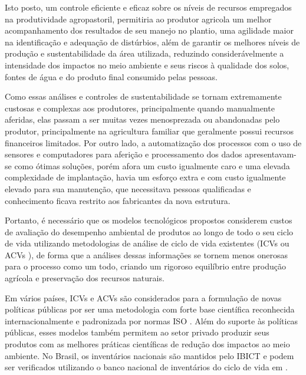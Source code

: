 Isto posto, um controle eficiente e eficaz sobre os n\'{i}veis de recursos empregados na produtividade agropastoril, permitiria ao produtor agricola um melhor acompanhamento dos resultados de seu manejo no plantio, uma agilidade maior na identifica\c{c}\~{a}o e adequa\c{c}\~{a}o de dist\'{u}rbios, al\'{e}m de garantir os melhores n\'{i}veis de produ\c{c}\~{a}o e sustentabilidade da \'{a}rea utilizada, reduzindo consider\'{a}velmente a intensidade dos impactos no meio ambiente e seus riscos \`{a} qualidade dos solos, fontes de \'{a}gua e do produto final consumido pelas pessoas.

Como essas an\'{a}lises e controles de sustentabilidade se tornam extremamente custosas e complexas aos produtores, principalmente quando manualmente aferidas, elas passam a ser muitas vezes menosprezada ou abandonadas pelo produtor, principalmente na agricultura familiar que geralmente possui recursos financeiros limitados. Por outro lado, a automatiza\c{c}\~{a}o dos processos com o uso de sensores e computadores para aferi\c{c}\~{a}o e processamento dos dados apresentavam-se como \'{o}timas solu\c{c}\~{o}es, por\'{e}m afora um custo igualmente caro e uma elevada complexidade de implanta\c{c}\~{a}o, havia um esfor\c{c}o extra e com custo igualmente elevado para sua manuten\c{c}\~{a}o, que necessitava pessoas qualificadas e conhecimento ficava restrito aos fabricantes da nova estrutura.

Portanto, \'{e} necessário que os modelos tecnol\'{o}gicos propostos considerem custos de avalia\c{c}\~{a}o do desempenho ambiental de produtos ao longo de todo o seu ciclo de vida utilizando metodologias de análise de ciclo de vida \cite{Frankl2000} existentes (ICVs  ou ACVs \cite{34779} \cite{CICLODEVIDA2017} ), de forma que a análises dessas informa\c{c}\~{o}es se tornem menos onerosas para o processo como um todo, criando um rigoroso equil\'{i}brio entre produ\c{c}\~{a}o agr\'{i}cola e preserva\c{c}\~{a}o dos recursos naturais.

Em vários países, ICVs e ACVs são considerados para a formulação de novas pol\'{i}ticas p\'{u}blicas por ser uma metodologia com forte base cient\'{i}fica reconhecida internacionalmente e padronizada por normas ISO \cite{ISO14040-2006} \cite{ISO14044-2006}. Al\'{e}m do suporte \`{a}s pol\'{i}ticas p\'{u}blicas, esses modelos tamb\'{e}m permitem ao setor privado produzir seus produtos com as melhores pr\'{a}ticas cient\'{i}ficas de redu\c{c}\~{a}o dos impactos ao meio ambiente. No Brasil, os invent\'{a}rios nacionais são mantidos pelo IBICT \cite{PBACV2017}  e podem ser verificados utilizando o banco nacional de invent\'{a}rios do ciclo de vida em \cite{SICV2017}.

